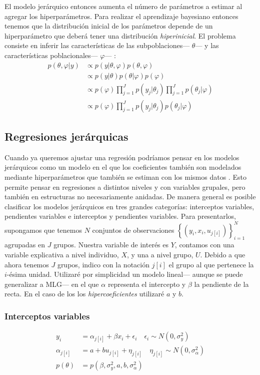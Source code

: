 El modelo jerárquico entonces aumenta el número de parámetros a estimar al agregar los hiperparámetros. Para realizar el aprendizaje bayesiano entonces tenemos que la distribución inicial de los parámetros depende de un hiperparámetro que deberá tener una distribución \textit{hiperinicial}. El problema consiste en inferir las características de las subpoblaciones--- $\theta$--- y las características poblacionales--- $\varphi$--- \parencite[23]{GP98}: 
\begin{align} \label{eq:Bayes_Modelo_Jer}	
p(\theta,\varphi|y) & \propto p(y|\theta,\varphi)p(\theta,\varphi) \nonumber \\
&\propto p(y|\theta)p(\theta|\varphi)p(\varphi) \nonumber \\
&\propto p(\varphi)\prod\limits_{j=1}^Jp(y_j|\theta_j)\prod\limits_{j=1}^Jp(\theta_j|\varphi) \nonumber \\
&\propto p(\varphi)\prod\limits_{j=1}^Jp(y_j|\theta_j)p(\theta_j|\varphi)
\end{align}

\subsection{Regresiones jerárquicas}

Cuando ya queremos ajustar una regresión podríamos pensar en los modelos jerárquicos como un modelo en el que los coeficientes también son modelados mediante hiperparámetros que también se estiman con los mismos datos \parencite[1]{GelmanHill06}. Esto permite pensar en regresiones a distintos niveles y con variables grupales, pero también en estructuras no necesariamente anidadas. De manera general es posible clasificar los modelos jerárquicos en tres grandes categorías: interceptos variables, pendientes variables e interceptos y pendientes variables. Para presentarlos, supongamos que tenemos $N$ conjuntos de observaciones $\left\lbrace(y_i,x_i,u_{j[i]})\right\rbrace_{i=1}^{N}$ agrupadas en $J$ grupos. Nuestra variable de interés es $Y$, contamos con una variable explicativa a nivel individuo, $X$,  y una a nivel grupo,  $U$.  Debido a que ahora tenemos $J$ grupos, indico con la notación $j[i]$ el grupo al que pertenece la $i$-ésima unidad. Utilizaré  por simplicidad un modelo lineal--- aunque se puede generalizar a MLG--- en el que $\alpha$ representa el intercepto y $\beta$ la pendiente de la recta. En el caso de los los \textit{hipercoeficientes} utilizaré $a$ y $b$. 

\subsubsection*{Interceptos variables}
\begin{align*}
y_i &= \alpha_{j[i]} + \beta x_i + \epsilon_i  \quad \epsilon_i  \sim N(0,\sigma_y^2) \\
\alpha_{j[i]} &= a + b u_{j[i]} + \eta_{j[i]} \quad \eta_{j[i]} \sim N(0, \sigma_{\alpha}^2) \\ 
p(\theta) &= p(\beta,\sigma_y^2,a,b,\sigma_{\alpha}^2)
\end{align*}

